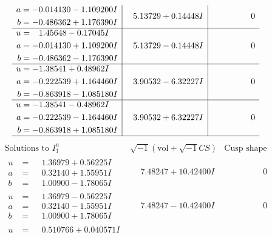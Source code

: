 \documentclass[1p]{elsarticle_modified}
\theoremstyle{definition}
\newcommand{\I}{\sqrt{-1}}
\begin{document}
$$\begin{array}{c|c|c}
\begin{aligned}
a &= -0.014130 - 1.109200 I \\
b &= -0.486362 + 1.176390 I\end{aligned}
 & \phantom{-}5.13729 + 0.14448 I & \phantom{-0.000000 } 0 \\ \hline\begin{aligned}
u &= \phantom{-}1.45648 - 0.17045 I \\
a &= -0.014130 + 1.109200 I \\
b &= -0.486362 - 1.176390 I\end{aligned}
 & \phantom{-}5.13729 - 0.14448 I & \phantom{-0.000000 } 0 \\ \hline\begin{aligned}
u &= -1.38541 + 0.48962 I \\
a &= -0.222539 + 1.164460 I \\
b &= -0.863918 - 1.085180 I\end{aligned}
 & \phantom{-}3.90532 - 6.32227 I & \phantom{-0.000000 } 0 \\ \hline\begin{aligned}
u &= -1.38541 - 0.48962 I \\
a &= -0.222539 - 1.164460 I \\
b &= -0.863918 + 1.085180 I\end{aligned}
 & \phantom{-}3.90532 + 6.32227 I & \phantom{-0.000000 } 0\\
 \hline 
 \end{array}$$\newpage$$\begin{array}{c|c|c}  
\text{Solutions to }I^u_{1}& \I (\text{vol} + \sqrt{-1}CS) & \text{Cusp shape}\\
 \hline 
\begin{aligned}
u &= \phantom{-}1.36979 + 0.56225 I \\
a &= \phantom{-}0.32140 + 1.55951 I \\
b &= \phantom{-}1.00900 - 1.78065 I\end{aligned}
 & \phantom{-}7.48247 + 10.42400 I & \phantom{-0.000000 } 0 \\ \hline\begin{aligned}
u &= \phantom{-}1.36979 - 0.56225 I \\
a &= \phantom{-}0.32140 - 1.55951 I \\
b &= \phantom{-}1.00900 + 1.78065 I\end{aligned}
 & \phantom{-}7.48247 - 10.42400 I & \phantom{-0.000000 } 0 \\ \hline\begin{aligned}
u &= \phantom{-}0.510766 + 0.040571 I \\

\end{aligned}
\end{array}$$
\end{document}
